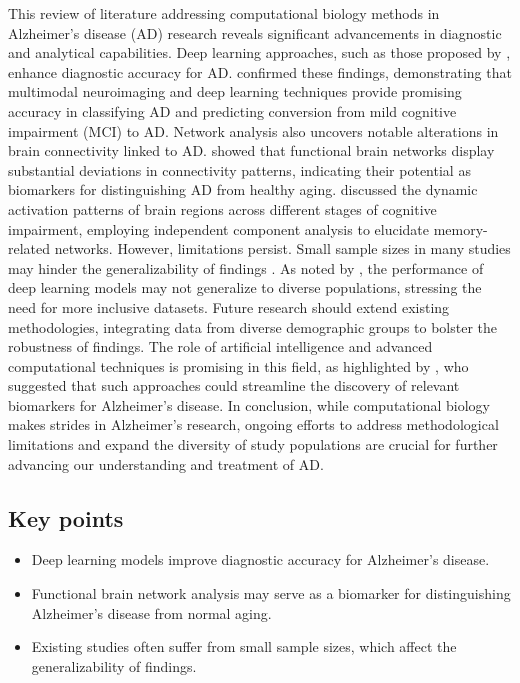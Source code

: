 \documentclass{MITcsail}
\begin{document}
This review of literature addressing computational biology methods in Alzheimer's disease (AD) research reveals significant advancements in diagnostic and analytical capabilities. Deep learning approaches, such as those proposed by \citet{ref_10_1109_isbi_2014_6868045}, enhance diagnostic accuracy for AD. \citet{ref_10_3389_fnagi_2019_00220} confirmed these findings, demonstrating that multimodal neuroimaging and deep learning techniques provide promising accuracy in classifying AD and predicting conversion from mild cognitive impairment (MCI) to AD. Network analysis also uncovers notable alterations in brain connectivity linked to AD. \citet{ref_10_1371_journal_pcbi_1000100} showed that functional brain networks display substantial deviations in connectivity patterns, indicating their potential as biomarkers for distinguishing AD from healthy aging. \citet{ref_10_1523_jneurosci_2250_06_2006} discussed the dynamic activation patterns of brain regions across different stages of cognitive impairment, employing independent component analysis to elucidate memory-related networks. However, limitations persist. Small sample sizes in many studies may hinder the generalizability of findings \citep{ref_10_1523_jneurosci_2250_06_2006,ref_10_1371_journal_pcbi_1000100}. As noted by \citet{ref_10_1148_radiol_2018180958}, the performance of deep learning models may not generalize to diverse populations, stressing the need for more inclusive datasets. Future research should extend existing methodologies, integrating data from diverse demographic groups to bolster the robustness of findings. The role of artificial intelligence and advanced computational techniques is promising in this field, as highlighted by \citet{ref_10_1002_alz_13390}, who suggested that such approaches could streamline the discovery of relevant biomarkers for Alzheimer's disease. In conclusion, while computational biology makes strides in Alzheimer's research, ongoing efforts to address methodological limitations and expand the diversity of study populations are crucial for further advancing our understanding and treatment of AD.

\subsection*{Key points}
\begin{itemize}
  \item Deep learning models improve diagnostic accuracy for Alzheimer's disease.
  \item Functional brain network analysis may serve as a biomarker for distinguishing Alzheimer’s disease from normal aging.
  \item Existing studies often suffer from small sample sizes, which affect the generalizability of findings.
\end{itemize}
\end{document}
